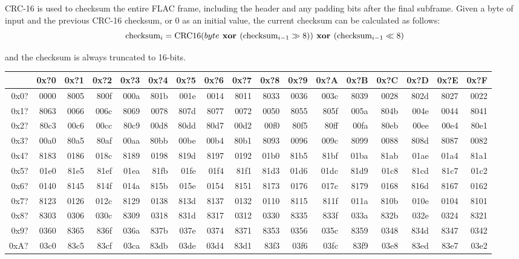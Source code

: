 CRC-16 is used to checksum the entire FLAC frame, including the header
and any padding bits after the final subframe.
Given a byte of input and the previous CRC-16 checksum,
or 0 as an initial value, the current checksum can be calculated as follows:
\begin{equation}
\text{checksum}_i = \text{CRC16}(byte\textbf{ xor }(\text{checksum}_{i - 1} \gg 8 ))\textbf{ xor }(\text{checksum}_{i - 1} \ll 8)
\end{equation}
\par
\noindent
and the checksum is always truncated to 16-bits.
\begin{table}[h]
{\ttfamily
\begin{tabular}{|r||r|r|r|r|r|r|r|r|r|r|r|r|r|r|r|r|}
\hline
 & 0x?0 & 0x?1 & 0x?2 & 0x?3 & 0x?4 & 0x?5 & 0x?6 & 0x?7 & 0x?8 & 0x?9 & 0x?A & 0x?B & 0x?C & 0x?D & 0x?E & 0x?F \\
\hline
0x0? & 0000 & 8005 & 800f & 000a & 801b & 001e & 0014 & 8011 & 8033 & 0036 & 003c & 8039 & 0028 & 802d & 8027 & 0022 \\
0x1? & 8063 & 0066 & 006c & 8069 & 0078 & 807d & 8077 & 0072 & 0050 & 8055 & 805f & 005a & 804b & 004e & 0044 & 8041 \\
0x2? & 80c3 & 00c6 & 00cc & 80c9 & 00d8 & 80dd & 80d7 & 00d2 & 00f0 & 80f5 & 80ff & 00fa & 80eb & 00ee & 00e4 & 80e1 \\
0x3? & 00a0 & 80a5 & 80af & 00aa & 80bb & 00be & 00b4 & 80b1 & 8093 & 0096 & 009c & 8099 & 0088 & 808d & 8087 & 0082 \\
0x4? & 8183 & 0186 & 018c & 8189 & 0198 & 819d & 8197 & 0192 & 01b0 & 81b5 & 81bf & 01ba & 81ab & 01ae & 01a4 & 81a1 \\
0x5? & 01e0 & 81e5 & 81ef & 01ea & 81fb & 01fe & 01f4 & 81f1 & 81d3 & 01d6 & 01dc & 81d9 & 01c8 & 81cd & 81c7 & 01c2 \\
0x6? & 0140 & 8145 & 814f & 014a & 815b & 015e & 0154 & 8151 & 8173 & 0176 & 017c & 8179 & 0168 & 816d & 8167 & 0162 \\
0x7? & 8123 & 0126 & 012c & 8129 & 0138 & 813d & 8137 & 0132 & 0110 & 8115 & 811f & 011a & 810b & 010e & 0104 & 8101 \\
0x8? & 8303 & 0306 & 030c & 8309 & 0318 & 831d & 8317 & 0312 & 0330 & 8335 & 833f & 033a & 832b & 032e & 0324 & 8321 \\
0x9? & 0360 & 8365 & 836f & 036a & 837b & 037e & 0374 & 8371 & 8353 & 0356 & 035c & 8359 & 0348 & 834d & 8347 & 0342 \\
0xA? & 03c0 & 83c5 & 83cf & 03ca & 83db & 03de & 03d4 & 83d1 & 83f3 & 03f6 & 03fc & 83f9 & 03e8 & 83ed & 83e7 & 03e2 \\

\end{tabular}}
\end{table}
